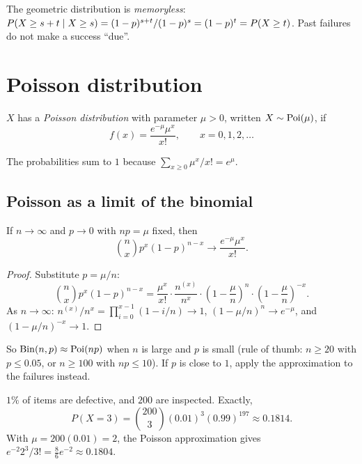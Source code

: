 The geometric distribution is \emph{memoryless}:
$P(X \ge s+t \mid X\ge s) = (1-p)^{s+t}/(1-p)^s = (1-p)^t = P(X\ge t)$. Past failures do
not make a success ``due''.

\section{Poisson distribution}

\begin{definition}
$X$ has a \emph{Poisson distribution} with parameter $\mu > 0$, written $X\sim\operatorname{Poi}(\mu)$, if
\[
  f(x) = \frac{e^{-\mu}\mu^x}{x!}, \qquad x = 0,1,2,\dots
\]
\end{definition}

The probabilities sum to $1$ because $\sum_{x\ge0}\mu^x/x! = e^{\mu}$.

\subsection{Poisson as a limit of the binomial}

\begin{theorem}
If $n\to\infty$ and $p\to0$ with $np = \mu$ fixed, then
\[
  \binom nx p^x (1-p)^{n-x} \to \frac{e^{-\mu}\mu^x}{x!}.
\]
\end{theorem}

\begin{proof}
Substitute $p = \mu/n$:
\[
  \binom nx p^x(1-p)^{n-x} = \frac{\mu^x}{x!}\cdot\frac{n^{(x)}}{n^x}\cdot
  \left(1-\frac{\mu}{n}\right)^n\cdot\left(1-\frac{\mu}{n}\right)^{-x}.
\]
As $n\to\infty$: $n^{(x)}/n^x = \prod_{i=0}^{x-1}(1 - i/n) \to 1$,
$(1-\mu/n)^n \to e^{-\mu}$, and $(1-\mu/n)^{-x} \to 1$.
\end{proof}

So $\operatorname{Bin}(n,p)\approx\operatorname{Poi}(np)$ when $n$ is large and $p$ is small (rule of thumb: $n\ge
20$ with $p\le 0.05$, or $n \ge 100$ with $np \le 10$). If $p$ is close to $1$, apply the
approximation to the failures instead.

\begin{example}
$1\%$ of items are defective, and $200$ are inspected. Exactly,
\[
  P(X=3) = \binom{200}{3}(0.01)^3(0.99)^{197} \approx 0.1814.
\] With $\mu = 200(0.01) = 2$,
the Poisson approximation gives $e^{-2}2^3/3! = \tfrac{8}{6}e^{-2} \approx 0.1804$.
\end{example}

